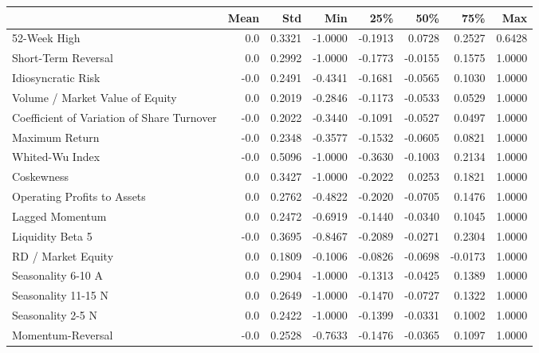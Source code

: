 \begin{tabular}{lrrrrrrr}
\toprule
{} &  Mean &     Std &     Min &     25\% &     50\% &     75\% &     Max \\
\midrule
52-Week High                               &   0.0 &  0.3321 & -1.0000 & -0.1913 &  0.0728 &  0.2527 &  0.6428 \\
Short-Term Reversal                        &   0.0 &  0.2992 & -1.0000 & -0.1773 & -0.0155 &  0.1575 &  1.0000 \\
Idiosyncratic Risk                         &  -0.0 &  0.2491 & -0.4341 & -0.1681 & -0.0565 &  0.1030 &  1.0000 \\
Volume / Market Value of Equity            &   0.0 &  0.2019 & -0.2846 & -0.1173 & -0.0533 &  0.0529 &  1.0000 \\
Coefficient of Variation of Share Turnover &  -0.0 &  0.2022 & -0.3440 & -0.1091 & -0.0527 &  0.0497 &  1.0000 \\
Maximum Return                             &  -0.0 &  0.2348 & -0.3577 & -0.1532 & -0.0605 &  0.0821 &  1.0000 \\
Whited-Wu Index                            &  -0.0 &  0.5096 & -1.0000 & -0.3630 & -0.1003 &  0.2134 &  1.0000 \\
Coskewness                                 &   0.0 &  0.3427 & -1.0000 & -0.2022 &  0.0253 &  0.1821 &  1.0000 \\
Operating Profits to Assets                &   0.0 &  0.2762 & -0.4822 & -0.2020 & -0.0705 &  0.1476 &  1.0000 \\
Lagged Momentum                            &   0.0 &  0.2472 & -0.6919 & -0.1440 & -0.0340 &  0.1045 &  1.0000 \\
Liquidity Beta 5                           &  -0.0 &  0.3695 & -0.8467 & -0.2089 & -0.0271 &  0.2304 &  1.0000 \\
RD / Market Equity                         &   0.0 &  0.1809 & -0.1006 & -0.0826 & -0.0698 & -0.0173 &  1.0000 \\
Seasonality 6-10 A                         &   0.0 &  0.2904 & -1.0000 & -0.1313 & -0.0425 &  0.1389 &  1.0000 \\
Seasonality 11-15 N                        &   0.0 &  0.2649 & -1.0000 & -0.1470 & -0.0727 &  0.1322 &  1.0000 \\
Seasonality 2-5 N                          &   0.0 &  0.2422 & -1.0000 & -0.1399 & -0.0331 &  0.1002 &  1.0000 \\
Momentum-Reversal                          &  -0.0 &  0.2528 & -0.7633 & -0.1476 & -0.0365 &  0.1097 &  1.0000 \\

\end{tabular}
